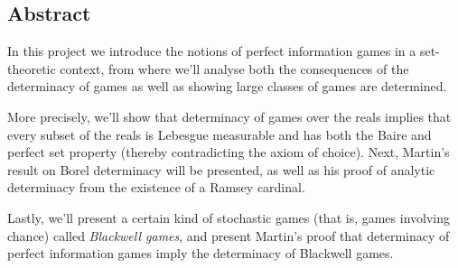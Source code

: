 \thispagestyle{fancy}
\setlength{\parindent}{18pt}

\begin{onehalfspacing}

\vspace*{75pt}

\section*{\huge Abstract}
In this project we introduce the notions of perfect information games in a set-theoretic context, from where we'll analyse both the consequences of the determinacy of games as well as showing large classes of games are determined.

More precisely, we'll show that determinacy of games over the reals implies that every subset of the reals is Lebesgue measurable and has both the Baire and perfect set property (thereby contradicting the axiom of choice). Next, Martin's result on Borel determinacy will be presented, as well as his proof of analytic determinacy from the existence of a Ramsey cardinal.

Lastly, we'll present a certain kind of stochastic games (that is, games involving chance) called \textit{Blackwell games}, and present Martin's proof that determinacy of perfect information games imply the determinacy of Blackwell games.

\end{onehalfspacing}
